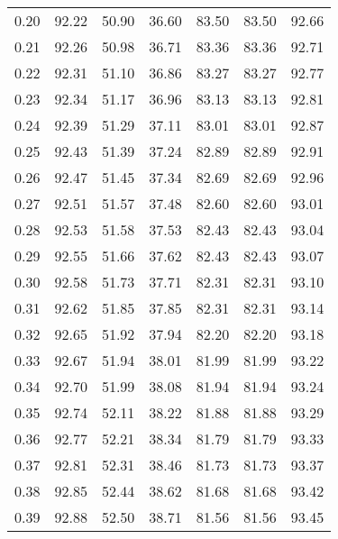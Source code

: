 \begin{tabular}{|c|c|c|c|c|c|c|}
      0.20 &     92.22 &     50.90 &      36.60 &   83.50 &      83.50 &         92.66 \\
      0.21 &     92.26 &     50.98 &      36.71 &   83.36 &      83.36 &         92.71 \\
      0.22 &     92.31 &     51.10 &      36.86 &   83.27 &      83.27 &         92.77 \\
      0.23 &     92.34 &     51.17 &      36.96 &   83.13 &      83.13 &         92.81 \\
      0.24 &     92.39 &     51.29 &      37.11 &   83.01 &      83.01 &         92.87 \\
      0.25 &     92.43 &     51.39 &      37.24 &   82.89 &      82.89 &         92.91 \\
      0.26 &     92.47 &     51.45 &      37.34 &   82.69 &      82.69 &         92.96 \\
      0.27 &     92.51 &     51.57 &      37.48 &   82.60 &      82.60 &         93.01 \\
      0.28 &     92.53 &     51.58 &      37.53 &   82.43 &      82.43 &         93.04 \\
      0.29 &     92.55 &     51.66 &      37.62 &   82.43 &      82.43 &         93.07 \\
      0.30 &     92.58 &     51.73 &      37.71 &   82.31 &      82.31 &         93.10 \\
      0.31 &     92.62 &     51.85 &      37.85 &   82.31 &      82.31 &         93.14 \\
      0.32 &     92.65 &     51.92 &      37.94 &   82.20 &      82.20 &         93.18 \\
      0.33 &     92.67 &     51.94 &      38.01 &   81.99 &      81.99 &         93.22 \\
      0.34 &     92.70 &     51.99 &      38.08 &   81.94 &      81.94 &         93.24 \\
      0.35 &     92.74 &     52.11 &      38.22 &   81.88 &      81.88 &         93.29 \\
      0.36 &     92.77 &     52.21 &      38.34 &   81.79 &      81.79 &         93.33 \\
      0.37 &     92.81 &     52.31 &      38.46 &   81.73 &      81.73 &         93.37 \\
      0.38 &     92.85 &     52.44 &      38.62 &   81.68 &      81.68 &         93.42 \\
      0.39 &     92.88 &     52.50 &      38.71 &   81.56 &      81.56 &         93.45 \\

\end{tabular}
